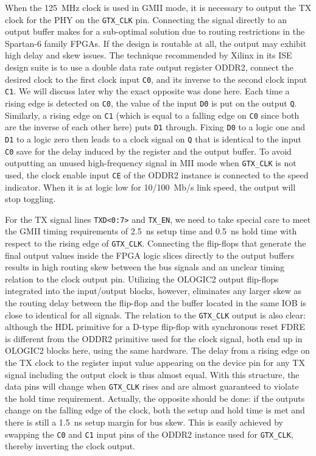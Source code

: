 \documentclass[a4paper, 11pt, oneside]{Thesis}  %
\begin{document}
When the 125~MHz clock is used in GMII mode, it is necessary to output the TX clock for the PHY on the \texttt{GTX\_CLK} pin. Connecting the signal directly to an output buffer makes for a sub-optimal solution due to routing restrictions in the Spartan-6 family FPGAs. If the design is routable at all, the output may exhibit high delay and skew issues. The technique recommended by Xilinx in its ISE design suite is to use a double data rate output register ODDR2, connect the desired clock to the first clock input \texttt{C0}, and its inverse to the second clock input \texttt{C1}. We will discuss later why the exact opposite was done here. Each time a rising edge is detected on \texttt{C0}, the value of the input \texttt{D0} is put on the output \texttt{Q}. Similarly, a rising edge on \texttt{C1} (which is equal to a falling edge on \texttt{C0} since both are the inverse of each other here) puts \texttt{D1} through. Fixing \texttt{D0} to a logic one and \texttt{D1} to a logic zero then leads to a clock signal on \texttt{Q} that is identical to the input \texttt{C0} save for the delay induced by the register and the output buffer. To avoid outputting an unused high-frequency signal in MII mode when \texttt{GTX\_CLK} is not used, the clock enable input \texttt{CE} of the ODDR2 instance is connected to the speed indicator. When it is at logic low for 10/100~Mb/s link speed, the output will stop toggling.

For the TX signal lines \texttt{TXD<0:7>} and \texttt{TX\_EN}, we need to take special care to meet the GMII timing requirements of 2.5~ns setup time and 0.5~ns hold time with respect to the rising edge of \texttt{GTX\_CLK}. Connecting the flip-flops that generate the final output values inside the FPGA logic slices directly to the output buffers results in high routing skew between the bus signals and an unclear timing relation to the clock output pin. Utilizing the OLOGIC2 output flip-flops integrated into the input/output blocks, however, eliminates any larger skew as the routing delay between the flip-flop and the buffer located in the same IOB is close to identical for all signals. The relation to the \texttt{GTX\_CLK} output is also clear: although the HDL primitive for a D-type flip-flop with synchronous reset FDRE is different from the ODDR2 primitive used for the clock signal, both end up in OLOGIC2 blocks here, using the same hardware. The delay from a rising edge on the TX clock to the register input value appearing on the device pin for any TX signal including the output clock is thus almost equal. With this structure, the data pins will change when \texttt{GTX\_CLK} rises and are almost guaranteed to violate the hold time requirement. Actually, the opposite should be done: if the outputs change on the falling edge of the clock, both the setup and hold time is met and there is still a 1.5~ns setup margin for bus skew. This is easily achieved by swapping the \texttt{C0} and \texttt{C1} input pins of the ODDR2 instance used for \texttt{GTX\_CLK}, thereby inverting the clock output.
\end{document}
